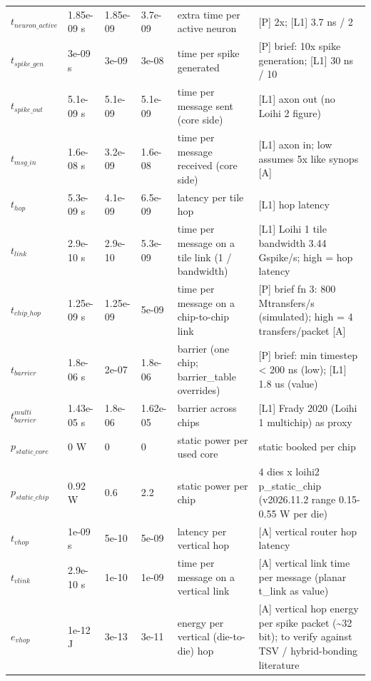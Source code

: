 \begin{tabular}{@{}llllll@{}}
$t_{neuron\_active}$ & 1.85e-09 s & 1.85e-09 & 3.7e-09 & extra time per active neuron & [P] 2x; [L1] 3.7 ns / 2 \\
$t_{spike\_gen}$ & 3e-09 s & 3e-09 & 3e-08 & time per spike generated & [P] brief: 10x spike generation; [L1] 30 ns / 10 \\
$t_{spike\_out}$ & 5.1e-09 s & 5.1e-09 & 5.1e-09 & time per message sent (core side) & [L1] axon out (no Loihi 2 figure) \\
$t_{msg\_in}$ & 1.6e-08 s & 3.2e-09 & 1.6e-08 & time per message received (core side) & [L1] axon in; low assumes 5x like synops [A] \\
$t_{hop}$ & 5.3e-09 s & 4.1e-09 & 6.5e-09 & latency per tile hop & [L1] hop latency \\
$t_{link}$ & 2.9e-10 s & 2.9e-10 & 5.3e-09 & time per message on a tile link (1 / bandwidth) & [L1] Loihi 1 tile bandwidth 3.44 Gspike/s; high = hop latency \\
$t_{chip\_hop}$ & 1.25e-09 s & 1.25e-09 & 5e-09 & time per message on a chip-to-chip link & [P] brief fn 3: 800 Mtransfers/s (simulated); high = 4 transfers/packet [A] \\
$t_{barrier}$ & 1.8e-06 s & 2e-07 & 1.8e-06 & barrier (one chip; barrier\_table overrides) & [P] brief: min timestep \textless{} 200 ns (low); [L1] 1.8 us (value) \\
$t_{barrier}^{multi}$ & 1.43e-05 s & 1.8e-06 & 1.62e-05 & barrier across chips & [L1] Frady 2020 (Loihi 1 multichip) as proxy \\
$p_{static\_core}$ & 0 W & 0 & 0 & static power per used core & static booked per chip \\
$p_{static\_chip}$ & 0.92 W & 0.6 & 2.2 & static power per chip & 4 dies x loihi2 p\_static\_chip (v2026.11.2 range 0.15-0.55 W per die) \\
$t_{vhop}$ & 1e-09 s & 5e-10 & 5e-09 & latency per vertical hop & [A] vertical router hop latency \\
$t_{vlink}$ & 2.9e-10 s & 1e-10 & 1e-09 & time per message on a vertical link & [A] vertical link time per message (planar t\_link as value) \\
$e_{vhop}$ & 1e-12 J & 3e-13 & 3e-11 & energy per vertical (die-to-die) hop & [A] vertical hop energy per spike packet (\textasciitilde{}32 bit); to verify against TSV / hybrid-bonding literature \\
\bottomrule
\end{tabular}
